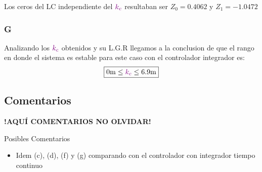Los ceros del LC independiente del \(\mathbin{\color{violet}k_c}\) resultaban ser $Z_{0} = 0.4062 $ y $Z_{1} = -1.0472$ 

\FloatBarrier
\subsubsection{G}%
 Analizando los \(\mathbin{\color{violet}k_c}\) obtenidos y su L.G.R llegamos a la
conclusion de que el rango en donde el sistema es estable para este caso con el controlador integrador es:
\begin{equation}
  \boxed{ 0\unit{m} \leq \mora{k_{c}} \leq 6.9\unit{m} }
\end{equation}

\FloatBarrier
\subsection{Comentarios}


\textbf{!AQUÍ COMENTARIOS NO OLVIDAR!}

Posibles Comentarios
\begin{itemize}
    \item Idem (c), (d), (f) y (g) comparando con el controlador con integrador tiempo continuo
\end{itemize}
